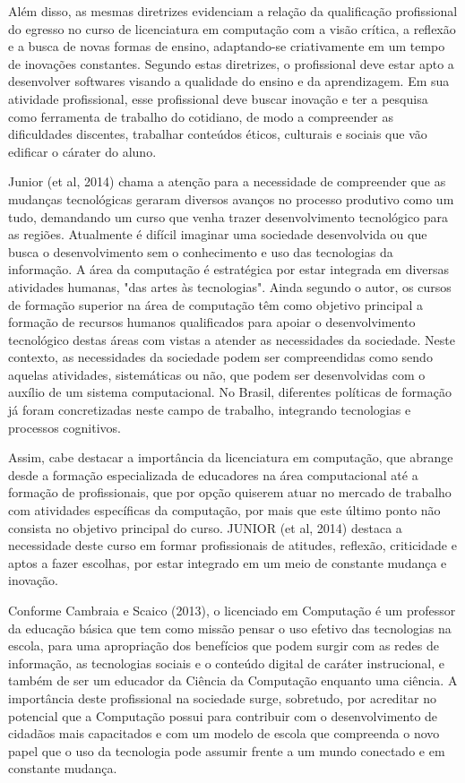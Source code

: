 Além disso, as mesmas diretrizes evidenciam a relação da qualificação profissional do egresso no curso de licenciatura em computação com a visão crítica, a reflexão e a busca de novas formas de ensino, adaptando-se criativamente em um tempo de inovações constantes. Segundo estas diretrizes, o profissional deve estar apto a desenvolver softwares visando a qualidade do ensino e da aprendizagem. Em sua atividade profissional, esse profissional deve buscar inovação e ter a pesquisa como ferramenta de trabalho do cotidiano, de modo a compreender as dificuldades discentes, trabalhar conteúdos éticos, culturais e sociais que vão edificar o cárater do aluno. 

Junior (et al, 2014) chama a atenção para a necessidade de compreender que as mudanças tecnológicas geraram diversos avanços no processo produtivo como um tudo, demandando um curso que venha trazer desenvolvimento tecnológico para as regiões. Atualmente é difícil imaginar uma sociedade desenvolvida ou que busca o desenvolvimento sem o conhecimento e uso das tecnologias da informação. A área da computação é estratégica por estar integrada em diversas atividades humanas, "das artes às tecnologias". Ainda segundo o autor, os cursos de formação superior na área de computação têm como objetivo principal a formação de recursos humanos qualificados para apoiar o desenvolvimento tecnológico destas áreas com vistas a atender as necessidades da sociedade. Neste contexto, as necessidades da sociedade podem ser compreendidas como sendo aquelas atividades, sistemáticas ou não, que podem ser desenvolvidas com o auxílio de um sistema computacional. No Brasil, diferentes políticas de formação já foram concretizadas neste campo de trabalho, integrando tecnologias e processos cognitivos.

Assim, cabe destacar a importância da licenciatura em computação, que abrange desde a formação especializada de educadores na área computacional até a formação de profissionais, que por opção quiserem atuar no mercado de trabalho com atividades específicas da computação, por mais que este último ponto não consista no objetivo principal do curso. JUNIOR (et al, 2014) destaca a necessidade deste curso em formar profissionais de atitudes, reflexão, criticidade e aptos a fazer escolhas, por estar integrado em um meio de constante mudança e inovação. 


Conforme Cambraia e Scaico (2013), o licenciado em Computação é um professor da educação básica que tem como missão pensar o uso efetivo das tecnologias na escola, para uma apropriação dos benefícios que podem surgir com as redes de informação, as tecnologias sociais e o conteúdo digital de caráter instrucional, e também de ser um educador da Ciência da Computação enquanto uma ciência. A importância deste profissional na sociedade surge, sobretudo, por acreditar no potencial que a Computação possui para contribuir com o desenvolvimento de cidadãos mais capacitados e com um modelo de escola que compreenda o novo papel que o uso da tecnologia pode assumir frente a um mundo conectado e em constante mudança.


